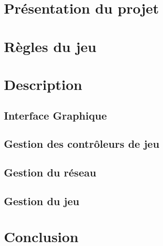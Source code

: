 \section*{Présentation du projet}


\section{Règles du jeu}


\section{Description}

	\subsection{Interface Graphique}
	
	\subsection{Gestion des contrôleurs de jeu}
	
	\subsection{Gestion du réseau}
	
	\subsection{Gestion du jeu}
	

\section*{Conclusion}

